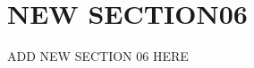 \documentclass[../main.tex]{subfiles}
\begin{document}
\section{NEW SECTION06}
\label{sec:new_section_06}
ADD NEW SECTION 06 HERE
\end{document}
